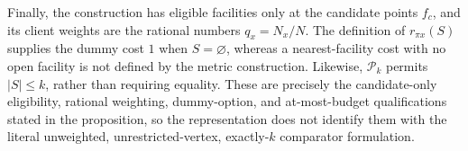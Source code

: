 Finally, the construction has eligible facilities only at the candidate points \(f_c\), and its client weights are the rational numbers \(q_x=N_x/N\).  The definition of \(r_{\pi x}(S)\) supplies the dummy cost \(1\) when \(S=\varnothing\), whereas a nearest-facility cost with no open facility is not defined by the metric construction.  Likewise, \(\mathcal P_k\) permits \(|S|\leq k\), rather than requiring equality.  These are precisely the candidate-only eligibility, rational weighting, dummy-option, and at-most-budget qualifications stated in the proposition, so the representation does not identify them with the literal unweighted, unrestricted-vertex, exactly-\(k\) comparator formulation.
